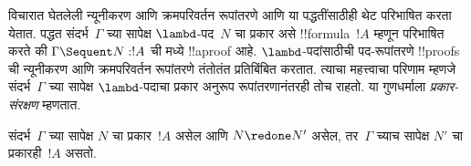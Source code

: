 \documentclass[../../../include/open-logic-section]{subfiles}
\begin{document}


विचारात घेतलेली न्यूनीकरण आणि क्रमपरिवर्तन रूपांतरणे
 आणि  या पद्धतींसाठीही थेट
परिभाषित करता येतात.  पद्धत संदर्भ~$\Gamma$
च्या सापेक्ष $\lambd$-पद~$N$ चा प्रकार असे
!!{formula}~$!A$ म्हणून परिभाषित करते की
$\Gamma \Sequent N : !A$ ची  मध्ये
!!a{proof} आहे. $\lambd$-पदांसाठीची
पद-रूपांतरणे !!{proof}s ची न्यूनीकरण
आणि क्रमपरिवर्तन रूपांतरणे तंतोतंत प्रतिबिंबित करतात.
त्याचा महत्त्वाचा परिणाम म्हणजे संदर्भ~$\Gamma$ च्या
सापेक्ष $\lambd$-पदाचा प्रकार अनुरूप रूपांतरणानंतरही
तोच राहतो. या गुणधर्माला \emph{प्रकार-संरक्षण} म्हणतात.

\begin{prop}
संदर्भ~$\Gamma$ च्या सापेक्ष $N$ चा प्रकार~$!A$
असेल आणि $N \redone N'$ असेल, तर~$\Gamma$ च्याच
सापेक्ष $N'$ चा प्रकारही~$!A$ असतो.
\end{prop}
\end{document}
